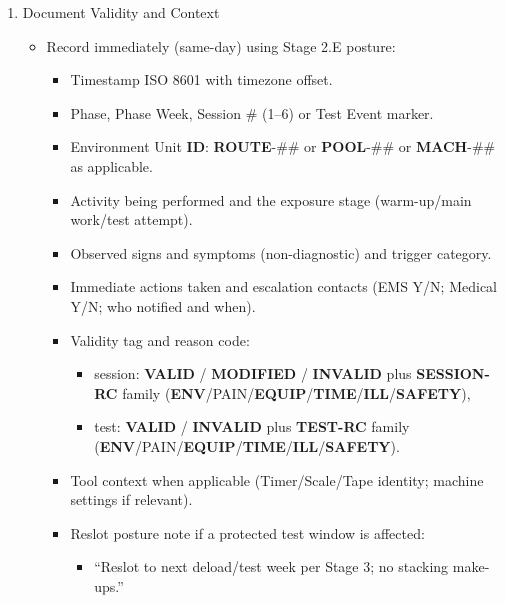 \documentclass[10pt]{article}
\begin{document}
\begin{enumerate}
\item Document Validity and Context
  \begin{itemize}
  \item Record immediately (same-day) using Stage 2.E posture:
    \begin{itemize}
    \item Timestamp ISO 8601 with timezone offset.
    \item Phase, Phase Week, Session \# (1–6) or Test Event marker.
    \item Environment Unit \textbf{ID}: \textbf{ROUTE}-\#\# or \textbf{POOL}-\#\# or \textbf{MACH}-\#\# as applicable.
    \item Activity being performed and the exposure stage (warm-up/main work/test attempt).
    \item Observed signs and symptoms (non-diagnostic) and trigger category.
    \item Immediate actions taken and escalation contacts (EMS Y/N; Medical Y/N; who notified and when).
    \item Validity tag and reason code:
      \begin{itemize}
      \item session: \textbf{VALID} / \textbf{MODIFIED} / \textbf{INVALID} plus \textbf{SESSION-RC} family (\textbf{ENV}/PAIN/\textbf{EQUIP}/\textbf{TIME}/\textbf{ILL}/\textbf{SAFETY}),
      \item test: \textbf{VALID} / \textbf{INVALID} plus \textbf{TEST-RC} family (\textbf{ENV}/PAIN/\textbf{EQUIP}/\textbf{TIME}/\textbf{ILL}/\textbf{SAFETY}).
      \end{itemize}
    \item Tool context when applicable (Timer/Scale/Tape identity; machine settings if relevant).
    \item Reslot posture note if a protected test window is affected:
      \begin{itemize}
      \item “Reslot to next deload/test week per Stage 3; no stacking make-ups.”
      \end{itemize}
    \end{itemize}
  \end{itemize}


\end{enumerate}
\end{document}
